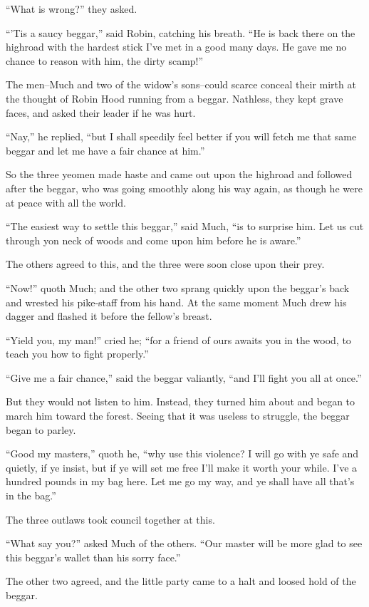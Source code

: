 ``What is wrong?'' they asked.

``'Tis a saucy beggar,'' said Robin, catching his breath. ``He is back
there on the highroad with the hardest stick I've met in a good many
days. He gave me no chance to reason with him, the dirty scamp!''

The men--Much and two of the widow's sons--could scarce conceal their
mirth at the thought of Robin Hood running from a beggar. Nathless, they
kept grave faces, and asked their leader if he was hurt.

``Nay,'' he replied, ``but I shall speedily feel better if you will
fetch me that same beggar and let me have a fair chance at him.''

So the three yeomen made haste and came out upon the highroad and
followed after the beggar, who was going smoothly along his way again,
as though he were at peace with all the world.

``The easiest way to settle this beggar,'' said Much, ``is to surprise
him. Let us cut through yon neck of woods and come upon him before he is
aware.''

The others agreed to this, and the three were soon close upon their
prey.

``Now!'' quoth Much; and the other two sprang quickly upon the beggar's
back and wrested his pike-staff from his hand. At the same moment Much
drew his dagger and flashed it before the fellow's breast.

``Yield you, my man!'' cried he; ``for a friend of ours awaits you in
the wood, to teach you how to fight properly.''

``Give me a fair chance,'' said the beggar valiantly, ``and I'll fight
you all at once.''

But they would not listen to him. Instead, they turned him about and
began to march him toward the forest. Seeing that it was useless to
struggle, the beggar began to parley.

``Good my masters,'' quoth he, ``why use this violence? I will go with
ye safe and quietly, if ye insist, but if ye will set me free I'll make
it worth your while. I've a hundred pounds in my bag here. Let me go my
way, and ye shall have all that's in the bag.''

The three outlaws took council together at this.

``What say you?'' asked Much of the others. ``Our master will be more
glad to see this beggar's wallet than his sorry face.''

The other two agreed, and the little party came to a halt and loosed
hold of the beggar.

